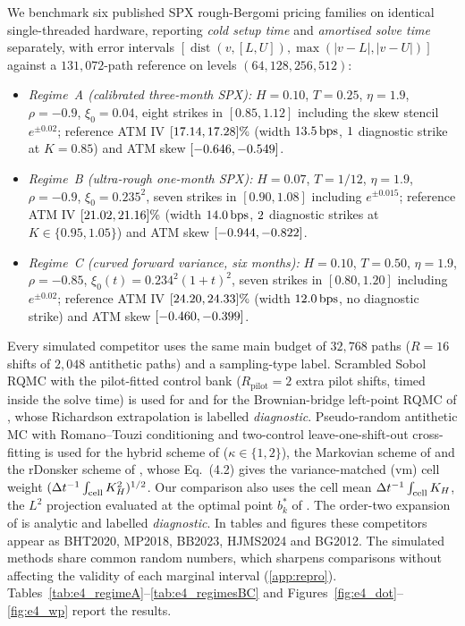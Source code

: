 We benchmark six published SPX rough-Bergomi pricing families on identical single-threaded hardware, reporting \emph{cold setup time} and \emph{amortised solve time} separately, with error intervals $[\operatorname{dist}(v,[L,U]),\max(|v-L|,|v-U|)]$ against a $131{,}072$-path \RCBridge{} reference on levels $(64,128,256,512)$:
\begin{itemize}
  \item \emph{Regime~A (calibrated three-month SPX):} $H=0.10$, $T=0.25$, $\eta=1.9$, $\rho=-0.9$, $\xi_0=0.04$, eight strikes in $[0.85,1.12]$ including the skew stencil $e^{\pm 0.02}$; reference ATM IV $[17.14,17.28]\%$ (width $13.5\,\mathrm{bps}$, $1$ diagnostic strike at $K=0.85$) and ATM skew $[-0.646,-0.549]$.
  \item \emph{Regime~B (ultra-rough one-month SPX):} $H=0.07$, $T=1/12$, $\eta=1.9$, $\rho=-0.9$, $\xi_0=0.235^2$, seven strikes in $[0.90,1.08]$ including $e^{\pm 0.015}$; reference ATM IV $[21.02,21.16]\%$ (width $14.0\,\mathrm{bps}$, $2$ diagnostic strikes at $K\in\{0.95,1.05\}$) and ATM skew $[-0.944,-0.822]$.
  \item \emph{Regime~C (curved forward variance, six months):} $H=0.10$, $T=0.50$, $\eta=1.9$, $\rho=-0.85$, $\xi_0(t)=0.234^2(1+t)^2$, seven strikes in $[0.80,1.20]$ including $e^{\pm 0.02}$; reference ATM IV $[24.20,24.33]\%$ (width $12.0\,\mathrm{bps}$, no diagnostic strike) and ATM skew $[-0.460,-0.399]$.
\end{itemize}
Every simulated competitor uses the same main budget of $32{,}768$ paths ($R=16$ shifts of $2{,}048$ antithetic paths) and a sampling-type label. Scrambled Sobol RQMC with the pilot-fitted control bank ($R_{\mathrm{pilot}}=2$ extra pilot shifts, timed inside the solve time) is used for \RCCE{} and for the Brownian-bridge left-point RQMC of \citet{BayerBenHammoudaTempone2020}, whose Richardson extrapolation is labelled \emph{diagnostic}. Pseudo-random antithetic MC with Romano--Touzi conditioning and two-control leave-one-shift-out cross-fitting is used for the hybrid scheme of \citet{McCrickerdPakkanen2018} ($\kappa\in\{1,2\}$), the Markovian scheme of \citet{BayerBreneis2023} and the rDonsker scheme of \citet{HorvathJacquierMuguruza2024}, whose Eq.~(4.2) gives the variance-matched (vm) cell weight $(\Delta t^{-1}\int_{\rm cell}K_H^2)^{1/2}$. Our comparison also uses the cell mean $\Delta t^{-1}\int_{\rm cell}K_H$, the $L^2$ projection evaluated at the optimal point $b_k^*$ of \citet{BennedsenLundePakkanen2017}. The order-two expansion of \citet{BergomiGuyon2012} is analytic and labelled \emph{diagnostic}. In tables and figures these competitors appear as BHT2020, MP2018, BB2023, HJMS2024 and BG2012. The simulated methods share common random numbers, which sharpens comparisons without affecting the validity of each marginal interval (\ref{app:repro}). Tables~\ref{tab:e4_regimeA}--\ref{tab:e4_regimesBC} and Figures~\ref{fig:e4_dot}--\ref{fig:e4_wp} report the results.

